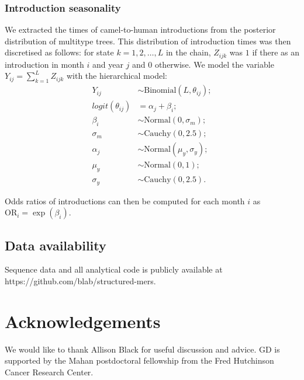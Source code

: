 \documentclass[11pt,oneside,letterpaper]{article}
\begin{document}
\subsubsection*{Introduction seasonality}

We extracted the times of camel-to-human introductions from the posterior distribution of multitype trees.
This distribution of introduction times was then discretised as follows: for state  $k = 1, 2, \ldots, L$ in the chain,  $Z_{ijk}$ was $1$ if there as an introduction in month $i$ and year $j$ and $0$ otherwise.
We model the variable $Y_{ij} = \sum_{k = 1}^L Z_{ijk}$ with the hierarchical model:
\begin{align*}
  Y_{ij} &\sim \text{Binomial}(L, \theta_{ij}); \\
  logit(\theta_{ij}) &= \alpha_j + \beta_i; \\
  \beta_i &\sim \text{Normal}(0, \sigma_{m}); \\
  \sigma_{m} &\sim \text{Cauchy}(0, 2.5); \\
  \alpha_j &\sim \text{Normal}(\mu_{y}, \sigma_{y}); \\
  \mu_{y}  &\sim  \text{Normal}(0, 1); \\
  \sigma_{y} &\sim \text{Cauchy}(0, 2.5).
\end{align*}

Odds ratios of introductions can then be computed for each month $i$ as $\text{OR}_i = \exp(\beta_i)$.

\subsection*{Data availability}
Sequence data and all analytical code is publicly available at https://github.com/blab/structured-mers.

\section*{Acknowledgements}
We would like to thank Allison Black for useful discussion and advice.
GD is supported by the Mahan postdoctoral fellowship from the Fred Hutchinson Cancer Research Center.





\newpage

\setcounter{figure}{0}
\setcounter{table}{0}
\renewcommand{\thefigure}{S\arabic{figure}}
\renewcommand{\thetable}{S\arabic{table}}
\end{document}
